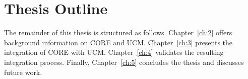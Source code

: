 \section{Thesis Outline}

The remainder of this thesis is structured as follows. Chapter~\ref{ch:2} offers background information on CORE and UCM. Chapter~\ref{ch:3} presents the integration of CORE with UCM. Chapter~\ref{ch:4} validates the resulting integration process. Finally, Chapter~\ref{ch:5} concludes the thesis and discusses future work.

